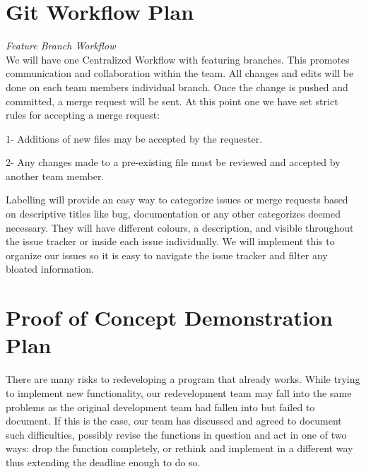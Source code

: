 \documentclass{article}
\begin{document}
\section{Git Workflow Plan}
\textit{Feature Branch Workflow\\}
We will have one Centralized Workflow with featuring branches. This promotes communication and collaboration within the team. All changes and edits will be done on each team members individual branch. Once the change is pushed and committed, a merge request will be sent. At this point one we have set strict rules for accepting a merge request: 

1- Additions of new files may be accepted by the requester.

2- Any changes made to a pre-existing file must be reviewed and accepted by another team member.

Labelling will provide an easy way to categorize issues or merge requests based on descriptive titles like bug, documentation or any other categorizes deemed necessary. They will have different colours, a description, and visible throughout the issue tracker or inside each issue individually. We will implement this to organize our issues so it is easy to navigate the issue tracker and filter any bloated information.

\section{Proof of Concept Demonstration Plan}

\indent There are many risks to redeveloping a program that already works. While trying to implement new functionality, our redevelopment team may fall into the same problems as the original development team had fallen into but failed to document. If this is the case, our team has discussed and agreed to document such difficulties, possibly revise the functions in question and act in one of two ways: drop the function completely, or rethink and implement in a different way thus extending the deadline enough to do so. \\
\end{document}
